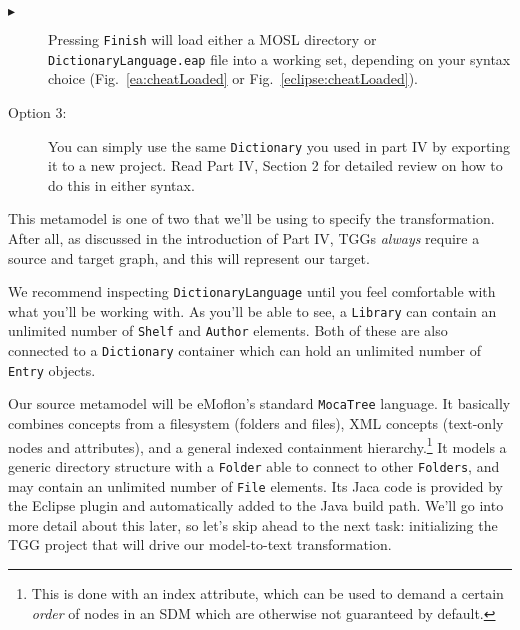\begin{description}
\item[$\blacktriangleright$] Pressing \texttt{Finish} will load either a MOSL directory or \texttt{DictionaryLanguage.eap} file into a working set, depending on
your syntax choice (Fig.~\ref{ea:cheatLoaded} or Fig.~\ref{eclipse:cheatLoaded}).

\begin{figure}[htbp]
   \centering
      \caption{}
\end{figure}


\clearpage
\item[Option 3:] You can simply use the same \texttt{Dictionary} you used in part IV by exporting it to a new project. Read Part IV, Section 2 for detailed
review on how to do this in either syntax.

\end{description} 

\vspace{0.5cm}

This metamodel is one of two that we'll be using to specify the transformation. After all, as discussed in the introduction of Part IV, TGGs \emph{always}
require a source and target graph, and this will represent our target. 

We recommend inspecting \texttt{DictionaryLanguage} until you feel comfortable with what you'll be working with. As you'll be able to see, a \texttt{Library}
can contain an unlimited number of \texttt{Shelf} and \texttt{Author} elements. Both of these are also connected to a \texttt{Dictionary} container which can
hold an unlimited number of \texttt{Entry} objects.

Our source metamodel will be eMoflon's standard \texttt{MocaTree} language. It basically combines concepts from a filesystem (folders and files), XML concepts
(text-only nodes and attributes), and a general indexed containment hierarchy.\footnote{This is done with an index attribute, which can be used to demand a
certain \emph{order} of nodes in an SDM which are otherwise not guaranteed by default.} It models a generic directory structure with a \texttt{Folder} able to
connect to other \texttt{Folders}, and may contain an unlimited number of \texttt{File} elements. Its Jaca code is provided by the Eclipse plugin and
automatically added to the Java build path.  We'll go into more detail about this later, so let's skip ahead to the next task: initializing the TGG project that
will drive our model-to-text transformation.







